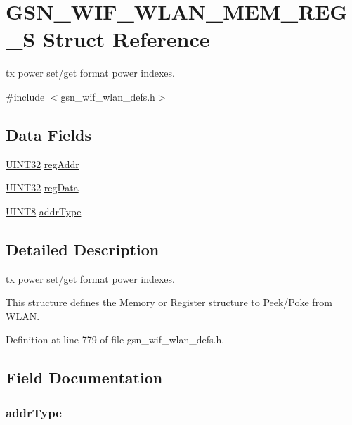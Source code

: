 \hypertarget{a00390}{
\section{GSN\_\-WIF\_\-WLAN\_\-MEM\_\-REG\_\-S Struct Reference}
\label{a00390}
}


tx power set/get format power indexes.  




{\ttfamily \#include $<$gsn\_\-wif\_\-wlan\_\-defs.h$>$}

\subsection*{Data Fields}
\begin{DoxyCompactItemize}
\item 
\hyperlink{a00660_gae1e6edbbc26d6fbc71a90190d0266018}{UINT32} \hyperlink{a00390_a1fb4766127cb7479ec14c3e966c18377}{regAddr}
\item 
\hyperlink{a00660_gae1e6edbbc26d6fbc71a90190d0266018}{UINT32} \hyperlink{a00390_aded5749b9f4991158fd95a242386d34e}{regData}
\item 
\hyperlink{a00660_gab27e9918b538ce9d8ca692479b375b6a}{UINT8} \hyperlink{a00390_a137a6a13416465c055ee6450e2a844e2}{addrType}
\end{DoxyCompactItemize}


\subsection{Detailed Description}
tx power set/get format power indexes. 

This structure defines the Memory or Register structure to Peek/Poke from WLAN. 

Definition at line 779 of file gsn\_\-wif\_\-wlan\_\-defs.h.



\subsection{Field Documentation}
\hypertarget{a00390_a137a6a13416465c055ee6450e2a844e2}{
\subsubsection[{addrType}]{ {\bf addrType}}}
\label{a00390_a137a6a13416465c055ee6450e2a844e2}


